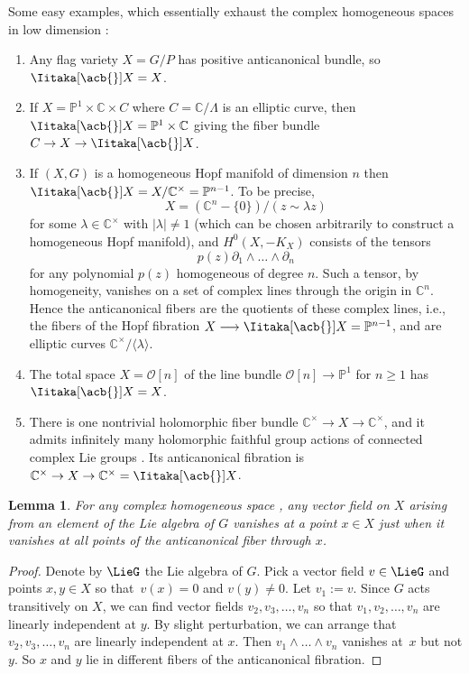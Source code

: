 \documentclass[pdftex]{sigma}
\numberwithin{equation}{section}
\newtheorem{Lemma}[Theorem]{Lemma}
\renewcommand{\C}{\mathbb{C}}
\newcommand{\OO}{\mathcal{O}}
\renewcommand{\Proj}[1]{{\mathbb{P}^{#1}}}
\newcommand*{\acf}[1]{\Iitaka[\acb{}]{#1}}
\begin{document}
\begin{Example}
Some easy examples, which essentially exhaust the complex homogeneous spaces in low dimension \cite{McKay:2015}:
\begin{enumerate}\itemsep=0pt
\item[(1)]
Any flag variety $X = G/P$ has positive anticanonical bundle, so $\acf{X} = X$.
\item[(2)]
If $X = \Proj{1} \times \C \times C$ where $C = \C/\Lambda$ is an elliptic curve, then $\acf{X}
 = \Proj{1} \times \C$ giving the fiber bundle $C \to X \to \acf{X}$.
\item[(3)]
If $(X, G)$ is a homogeneous Hopf manifold of dimension $n$ then $\acf{X} = X/\C^{\times} = \Proj{n-1}$.
To be precise,
\[X = (\C^{n}-\{0\})/(z\sim\lambda z)\]
 for some $\lambda \in \C^{\times}$ with $|\lambda| \ne 1$ (which
can be chosen arbitrarily to construct a homogeneous Hopf manifold), and $H^0(X, -K_X)$ consists of the tensors
\[
p(z)\partial_1\wedge\dots\wedge\partial_n
\]
for any polynomial $p(z)$ homogeneous of degree $n$.
Such a tensor, by homogeneity, vanishes on a set of complex lines through the origin in $\C^{n}$.
Hence the anticanonical fibers are the quotients of these complex lines, i.e., the fibers of the Hopf fibration $X \longrightarrow \acf{X}
 = \Proj{n-1}$, and are elliptic curves $\C^{\times}/\langle \lambda\rangle$.
\item[(4)]
The total space $X = \OO[n]$ of the line bundle $\OO[n] \to \Proj{1}$ for $n \ge 1$ has $\acf{X} = X$.
\item[(5)]
There is one nontrivial holomorphic fiber bundle $\C^{\times} \to X \to \C^{\times}$, and it admits infinitely many holomorphic faithful group actions of connected complex Lie groups \cite{McKay:2015}.
Its anticanonical fibration is $\C^{\times} \to X \to \C^{\times} = \acf{X}$.
\end{enumerate}
\end{Example}

\begin{Lemma}\label{lemma:all.points}
For any complex homogeneous space , any vector field on $X$ arising from an element of the Lie algebra of $G$ vanishes
at a point $x \in X$ just when it vanishes at all points of the anticanonical fiber through $x$.
\end{Lemma}

\begin{proof}
Denote by $\LieG$ the Lie algebra of $G$.
Pick a vector field $v \in \LieG$ and points $x, y \in X$ so that~${v(x) = 0}$ and $v(y) \ne 0$.
Let $v_1 := v$.
Since $G$ acts transitively on $X$, we can find vector fields $v_2, v_3, \dots, v_n$ so that $v_1, v_2,
 \dots, v_n$ are linearly independent at $y$.
By slight perturbation, we can arrange that $v_2, v_3, \dots, v_n$ are linearly independent at $x$.
Then $v_1 \wedge \dots \wedge v_n$ vanishes at~$x$ but not $y$.
So $x$ and $y$ lie in different fibers of the anticanonical fibration.
\end{proof}
\end{document}
